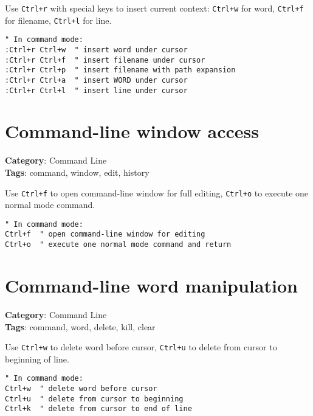 {{{{Use {\footnotesize \Verb§Ctrl+r§} with special keys to insert current context: {\footnotesize \Verb§Ctrl+w§} for word, {\footnotesize \Verb§Ctrl+f§} for filename, {\footnotesize \Verb§Ctrl+l§} for line.

\begin{Exa*}{}
\begin{Verbatim}[fontsize=\footnotesize, breaklines, breakanywhere]
" In command mode:
:Ctrl+r Ctrl+w  " insert word under cursor
:Ctrl+r Ctrl+f  " insert filename under cursor
:Ctrl+r Ctrl+p  " insert filename with path expansion
:Ctrl+r Ctrl+a  " insert WORD under cursor
:Ctrl+r Ctrl+l  " insert line under cursor
\end{Verbatim}
\end{Exa*}

\section{Command-line window access}

\textbf{Category}: Command Line\\ \textbf{Tags}: command, window, edit, history
\vspace{0.5cm}

Use {\footnotesize \Verb§Ctrl+f§} to open command-line window for full editing, {\footnotesize \Verb§Ctrl+o§} to execute one normal mode command.

\begin{Exa*}{}
\begin{Verbatim}[fontsize=\footnotesize, breaklines, breakanywhere]
" In command mode:
Ctrl+f  " open command-line window for editing
Ctrl+o  " execute one normal mode command and return
\end{Verbatim}
\end{Exa*}

\section{Command-line word manipulation}

\textbf{Category}: Command Line\\ \textbf{Tags}: command, word, delete, kill, clear
\vspace{0.5cm}

Use {\footnotesize \Verb§Ctrl+w§} to delete word before cursor, {\footnotesize \Verb§Ctrl+u§} to delete from cursor to beginning of line.

\begin{Exa*}{}
\begin{Verbatim}[fontsize=\footnotesize, breaklines, breakanywhere]
" In command mode:
Ctrl+w  " delete word before cursor
Ctrl+u  " delete from cursor to beginning
Ctrl+k  " delete from cursor to end of line
\end{Verbatim}
\end{Exa*}

}}}}

